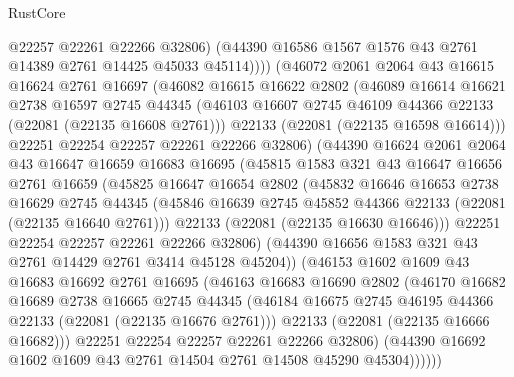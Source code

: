 \begin{lexlean}{RustCore}
\begin{coremodule}
                @22257
                @22261
                @22266
                @32806)
              (@44390 @16586 @1567 @1576 @43 @2761 @14389 @2761 @14425 @45033 @45114))))
        (@46072
          @2061
          @2064
          @43
          @16615
          @16624
          @2761
          @16697
          (@46082
            @16615
            @16622
            @2802
            (@46089
              @16614
              @16621
              @2738
              @16597
              @2745
              @44345
              (@46103 @16607 @2745 @46109 @44366 @22133 (@22081 (@22135 @16608 @2761)))
              @22133
              (@22081 (@22135 @16598 @16614)))
            @22251
            @22254
            @22257
            @22261
            @22266
            @32806)
          (@44390
            @16624
            @2061
            @2064
            @43
            @16647
            @16659
            @16683
            @16695
            (@45815
              @1583
              @321
              @43
              @16647
              @16656
              @2761
              @16659
              (@45825
                @16647
                @16654
                @2802
                (@45832
                  @16646
                  @16653
                  @2738
                  @16629
                  @2745
                  @44345
                  (@45846 @16639 @2745 @45852 @44366 @22133 (@22081 (@22135 @16640 @2761)))
                  @22133
                  (@22081 (@22135 @16630 @16646)))
                @22251
                @22254
                @22257
                @22261
                @22266
                @32806)
              (@44390 @16656 @1583 @321 @43 @2761 @14429 @2761 @3414 @45128 @45204))
            (@46153
              @1602
              @1609
              @43
              @16683
              @16692
              @2761
              @16695
              (@46163
                @16683
                @16690
                @2802
                (@46170
                  @16682
                  @16689
                  @2738
                  @16665
                  @2745
                  @44345
                  (@46184 @16675 @2745 @46195 @44366 @22133 (@22081 (@22135 @16676 @2761)))
                  @22133
                  (@22081 (@22135 @16666 @16682)))
                @22251
                @22254
                @22257
                @22261
                @22266
                @32806)
              (@44390 @16692 @1602 @1609 @43 @2761 @14504 @2761 @14508 @45290 @45304))))))

\end{coremodule}
\end{lexlean}
